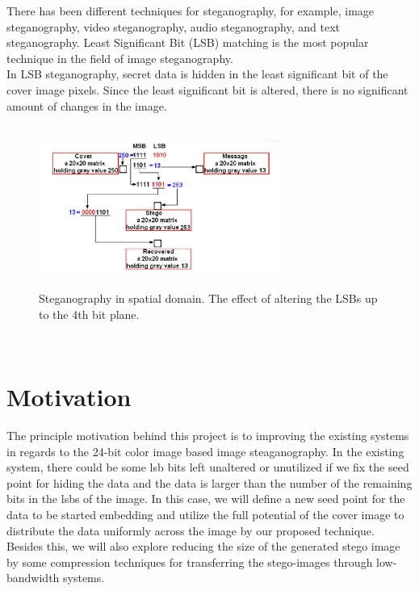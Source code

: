 \documentclass{report}
\begin{document}
\vspace{0.5cm}
There has been different techniques for steganography, for example, image steganography, video steganography, audio steganography, and text steganography. Least Significant Bit (LSB) matching is the most popular technique in the field of image steganography.\\
In LSB steganography, secret data is hidden in the least significant bit of the cover image pixels. Since the least significant bit is altered, there is no significant amount of changes in the image.
\\
\begin{figure}[htbp]
  \centering
  \includegraphics[width=0.7\textwidth, height=5.3cm]{image3.png} 
  \caption{Steganography in spatial domain. The effect of altering the LSBs up to the 4th bit plane.\cite{cheddad2010digital} }
  \label{fig:2}
\end{figure}
\\
\section{Motivation}
The principle motivation behind this project is to improving the existing systems in regards to the 24-bit color image based image steaganography. In the existing system, there could be some lsb bits left unaltered or unutilized if we fix the seed point for hiding the data and the data is larger than the number of the remaining bits in the lsbs of the image. In this case, we will define a new seed point for the data to be started embedding and utilize the full potential of the cover image to distribute the data uniformly across the image by our proposed technique. Besides this, we will also explore reducing the size of the generated stego image by some compression techniques for transferring the stego-images through low-bandwidth systems.
\end{document}
